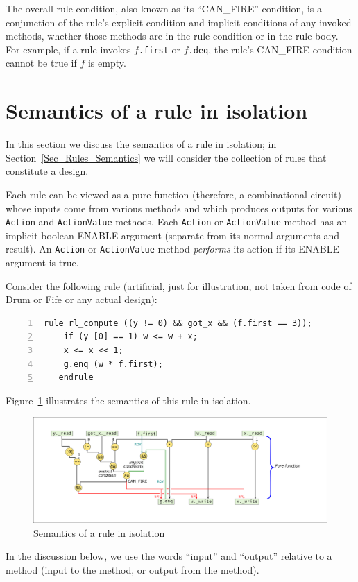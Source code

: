 
The overall rule condition, also known as its ``CAN\_FIRE'' condition,
is a conjunction of the rule's explicit condition and implicit
conditions of any invoked methods, whether those methods are in the
rule condition or in the rule body.  For example, if a rule invokes
$f$\verb|.first| or $f$\verb|.deq|, the rule's CAN\_FIRE condition
cannot be true if $f$ is empty.


\section{Semantics of a rule in isolation}

\label{Sec_Single_Rule_Semantics}


In this section we discuss the semantics of a rule in isolation; in
Section~\ref{Sec_Rules_Semantics} we will consider the collection of
rules that constitute a {\BSV} design.

Each rule can be viewed as a pure function (therefore, a combinational
circuit) whose inputs come from various methods and which produces
outputs for various \verb|Action| and \verb|ActionValue| methods.
Each \verb|Action| or \verb|ActionValue| method has an implicit
boolean ENABLE argument (separate from its normal arguments and
result).  An \verb|Action| or \verb|ActionValue| method
\emph{performs} its action if its ENABLE argument is true.

Consider the following rule (artificial, just for illustration, not
taken from code of Drum or Fife or any actual design):

{\footnotesize
\begin{Verbatim}[frame=single, numbers=left]
   rule rl_compute ((y != 0) && got_x && (f.first == 3));
    if (y [0] == 1) w <= w + x;
    x <= x << 1;
    g.enq (w * f.first);
   endrule
\end{Verbatim}
}

Figure~\ref{Fig_Rule_Actions_1} illustrates the semantics of this rule
in isolation.
\begin{figure}[htbp]
  \centerline{\includegraphics[width=6in,angle=0]{Figures/Fig_Rule_Actions_1}}
  \caption{\label{Fig_Rule_Actions_1} Semantics of a rule in isolation}
\end{figure}
In the discussion below, we use the words ``input'' and ``output''
relative to a method (input to the method, or output from the method).

